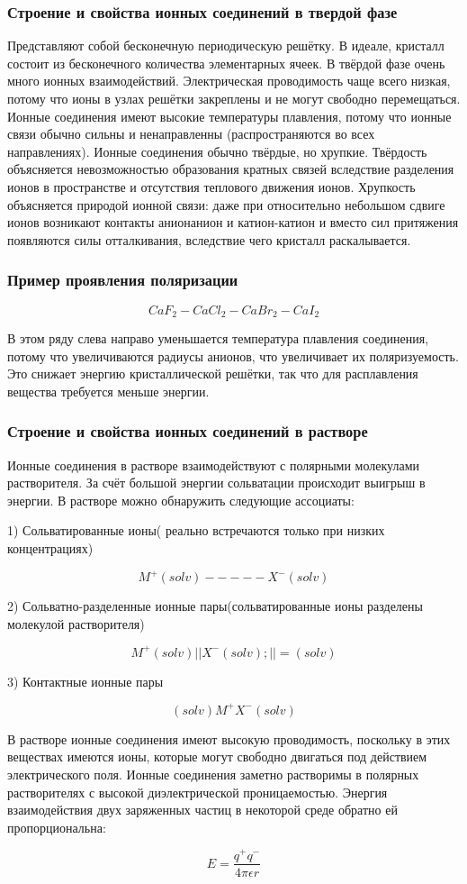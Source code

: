 \subsubsection*{\textbf{Строение и свойства ионных соединений в твердой фазе}}

Представляют собой бесконечную периодическую решётку. В
идеале, кристалл состоит из бесконечного количества
элементарных ячеек. В твёрдой фазе очень много ионных
взаимодействий. Электрическая проводимость чаще всего низкая,
потому что ионы в узлах решётки закреплены и не могут свободно
перемещаться. Ионные соединения имеют высокие температуры
плавления, потому что ионные связи обычно сильны и
ненаправленны (распространяются во всех направлениях). Ионные
соединения обычно твёрдые, но хрупкие. Твёрдость объясняется
невозможностью образования кратных связей вследствие
разделения ионов в пространстве и отсутствия теплового движения
ионов. Хрупкость объясняется природой ионной связи: даже при
относительно небольшом сдвиге ионов возникают контакты анионанион и катион-катион и вместо сил притяжения появляются силы
отталкивания, вследствие чего кристалл раскалывается.

\subsubsection*{\textbf{Пример проявления поляризации}}

$$CaF_2 - CaCl_2 - CaBr_2 - CaI_2$$

В этом ряду слева направо уменьшается температура
плавления соединения, потому что увеличиваются
радиусы анионов, что увеличивает их
поляризуемость. Это снижает энергию
кристаллической решётки, так что для расплавления
вещества требуется меньше энергии.

\subsubsection*{\textbf{Строение и свойства ионных соединений в растворе}}

Ионные соединения в растворе взаимодействуют с полярными
молекулами растворителя. За счёт большой энергии сольватации
происходит выигрыш в энергии. В растворе можно обнаружить
следующие ассоциаты:


1) Сольватированные ионы( реально встречаются только при низких концентрациях)

$$M^+(solv) - - - - -X^-(solv)$$

2) Сольватно-разделенные ионные пары(сольватированные ионы разделены молекулой растворителя)

$$M^+(solv) || X^-(solv); ||=(solv)$$

3) Контактные ионные пары

$$(solv)M^+X^-(solv)$$

В растворе ионные соединения имеют высокую проводимость,
поскольку в этих веществах имеются ионы, которые могут
свободно двигаться под действием электрического поля. Ионные
соединения заметно растворимы в полярных растворителях с
высокой диэлектрической проницаемостью. Энергия
взаимодействия двух заряженных частиц в некоторой среде обратно
ей пропорциональна:


$$E = \frac{q^+q^-}{4\pi\epsilon r}$$
